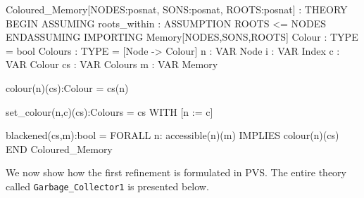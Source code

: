 \begin{smallsession}
Coloured_Memory[NODES:posnat, SONS:posnat, ROOTS:posnat] : THEORY
BEGIN
  ASSUMING roots_within : ASSUMPTION ROOTS <= NODES ENDASSUMING
  IMPORTING Memory[NODES,SONS,ROOTS]
  Colour  : TYPE = bool
  Colours : TYPE = [Node -> Colour]
  n  : VAR Node 
  i  : VAR Index
  c  : VAR Colour
  cs : VAR Colours
  m  : VAR Memory

  colour(n)(cs):Colour = cs(n)

  set_colour(n,c)(cs):Colours = cs WITH [n := c]

  blackened(cs,m):bool = FORALL n: accessible(n)(m) IMPLIES colour(n)(cs)
END Coloured_Memory
\end{smallsession}
\label{pvs-coloured-memory}

We now show how the first refinement is formulated in PVS.  The entire
theory called  {\tt  Garbage\_Collector1} is presented below. 

